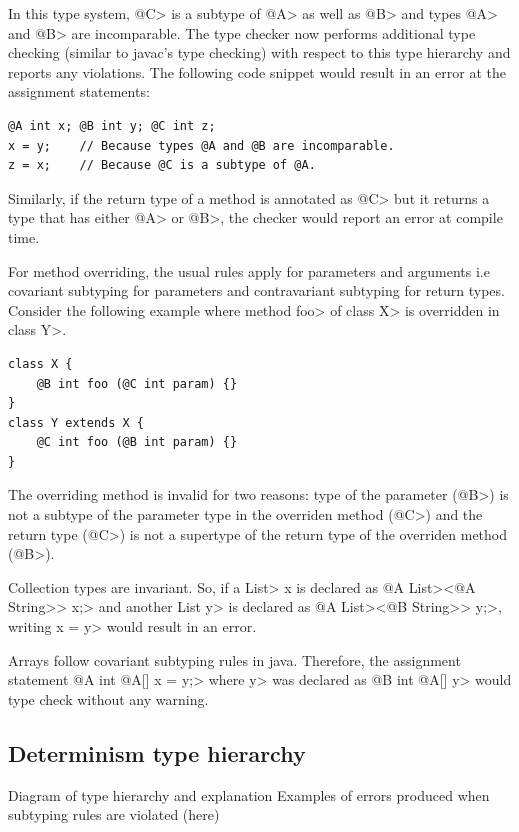 In this type system, \<@C> is a subtype of \<@A> as well as \<@B> and types \<@A> and \<@B> are incomparable.
The type checker now performs additional type checking (similar to javac's type checking) with respect to this type hierarchy
and reports any violations. The following code snippet would result in an error at the assignment statements:
\begin{verbatim}
@A int x; @B int y; @C int z;
x = y;    // Because types @A and @B are incomparable.
z = x;    // Because @C is a subtype of @A.
\end{verbatim}
Similarly, if the return type of a method is annotated as \<@C> but it returns a type that has either \<@A> or \<@B>, the
checker would report an error at compile time.

For method overriding, the usual rules apply for parameters and arguments i.e covariant subtyping for parameters
and contravariant subtyping for return types. Consider the following example where method \<foo> of \<class X> is overridden
in \<class Y>.
\begin{verbatim}
class X {
	@B int foo (@C int param) {}
}
class Y extends X {
	@C int foo (@B int param) {}
}
\end{verbatim}
The overriding method is invalid for two reasons: type of the parameter (\<@B>) is not a subtype of the parameter type in the overriden method (\<@C>) and the return type (\<@C>) is not a supertype of the return type of the overriden method (\<@B>).

Collection types are invariant. So, if a \<List> x is declared as \<@A List><\<@A String>> \<x;> and another \<List y> is declared
as  \<@A List><\<@B String>> \<y;>, writing \<x = y> would result in an error.

Arrays follow covariant subtyping rules in java. Therefore, the assignment statement \<@A int @A[] x = y;> where \<y> was 
declared as \<@B int @A[] y> would type check without any warning.

\subsection{Determinism type hierarchy}
Diagram of type hierarchy and explanation
Examples of errors produced when subtyping rules are violated (here)

